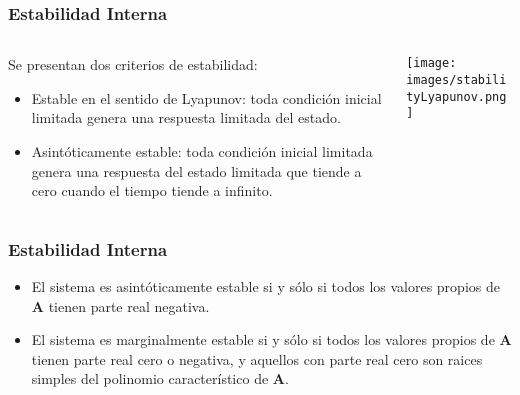 \documentclass[aspectratio=169,handout]{beamer}
\theoremstyle{definition}
\theoremstyle{plain}
\theoremstyle{remark}
\begin{document}
\begin{frame}[<+->]\frametitle{Estabilidad Interna}
\vspace*{5mm}
\begin{columns}
\begin{column}{0.5\textwidth}
Se presentan dos criterios de estabilidad:
\begin{itemize}
  \item Estable en el sentido de Lyapunov: toda condición inicial limitada genera una respuesta limitada del estado.
  \item Asintóticamente estable: toda condición inicial limitada genera una respuesta del estado limitada que tiende a cero cuando el tiempo tiende a infinito. 
\end{itemize}
\end{column}	
\begin{column}{0.5\textwidth}
\centering
\texttt{[image: images/stabilityLyapunov.png]}
\end{column}	
\end{columns}
\end{frame}

\begin{frame}[<-+>]\frametitle{Estabilidad Interna}
\begin{theorem}\label{th:internalStability1}
\begin{itemize}
  \item El sistema es asintóticamente estable si y sólo si todos los valores propios de $\mathbf{A}$ tienen parte real negativa.
  \item El sistema es marginalmente estable si y sólo si todos los valores propios de $\mathbf{A}$ tienen parte real cero o negativa, y aquellos con parte real cero son raices simples del polinomio característico de $\mathbf{A}$.
\end{itemize}
\end{theorem}
\end{frame}
\end{document}
